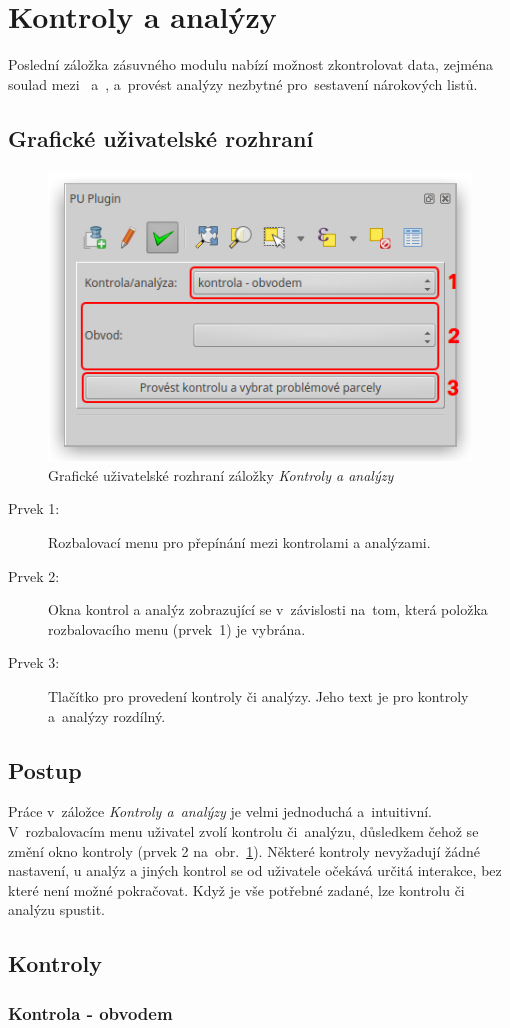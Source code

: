 \newpage

\section{Kontroly a analýzy}
\label{kontroly_analyzy}

Poslední záložka zásuvného modulu nabízí možnost zkontrolovat data, zejména soulad mezi~ a~, a~provést analýzy nezbytné pro~sestavení nárokových listů.

\subsection{Grafické uživatelské rozhraní}
\label{ca_gui}

	\begin{figure}[H]
		\centering
		\includegraphics[width=.55\textwidth]{./pictures/ca_gui.png}
		\caption[Grafické uživatelské rozhraní záložky \textit{Kontroly a analýzy}]{Grafické uživatelské rozhraní záložky \textit{Kontroly a analýzy}}
		\label{fig:ca_gui}
 	\end{figure}

\begin{description}
	\item[Prvek 1:] Rozbalovací menu pro přepínání mezi kontrolami a analýzami.
	\item[Prvek 2:] Okna kontrol a analýz zobrazující se v~závislosti na~tom, která položka rozbalovacího menu (prvek~1) je vybrána.
	\item[Prvek 3:] Tlačítko pro provedení kontroly či analýzy. Jeho text je pro kontroly a~analýzy rozdílný.
\end{description}

\subsection{Postup}
\label{postup_ca}

Práce v~záložce \textit{Kontroly a~analýzy} je velmi jednoduchá a~intuitivní. V~rozbalovacím menu uživatel zvolí kontrolu či~analýzu, důsledkem čehož se změní okno kontroly (prvek 2 na~obr.~\ref{fig:ca_gui}). Některé kontroly nevyžadují žádné nastavení, u analýz a jiných kontrol se od uživatele očekává určitá interakce, bez které není možné pokračovat. Když je vše potřebné zadané, lze kontrolu či analýzu spustit.

\subsection{Kontroly}
\label{kontroly}

\subsubsection{Kontrola - obvodem}
\label{kontrola_obvodem}

